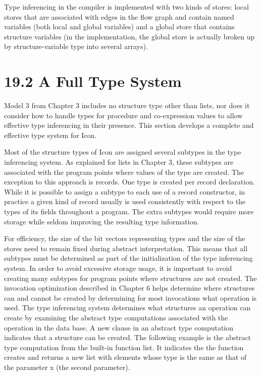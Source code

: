 Type inferencing in the compiler is implemented with two kinds of
stores: local stores that are associated with edges in the flow graph
and contain named variables (both local and global variables) and a
global store that contains structure variables (in the implementation,
the global store is actually broken up by structure-variable type into
several arrays).


\section[19.2 A Full Type System]{19.2 A Full Type System}

Model 3 from Chapter 3 includes no structure type other than lists,
nor does it consider how to handle types for procedure and
co-expression values to allow effective type inferencing in their
presence. This section develops a complete and effective type system
for Icon.

Most of the structure types of Icon are assigned several subtypes in
the type inferencing system. As explained for lists in Chapter 3,
these subtypes are associated with the program points where values of
the type are created. The exception to this approach is records. One
type is created per record declaration. While it is possible to assign
a subtype to each use of a record constructor, in practice a given
kind of record usually is used consistently with respect to the types
of its fields throughout a program. The extra subtypes would require
more storage while seldom improving the resulting type information.

For efficiency, the size of the bit vectors representing types and the
size of the stores need to remain fixed during abstract
interpretation. This means that all subtypes must be determined as
part of the initialization of the type inferencing system. In order to
avoid excessive storage usage, it is important to avoid creating many
subtypes for program points where structures are not created. The
invocation optimization described in Chapter 6 helps determine where
structures can and cannot be created by determining for most
invocations what operation is used. The type inferencing system
determines what structures an operation can create by examining the
abstract type computations associated with the operation in the data
base. A new clause in an abstract type computation indicates that a
structure can be created. The following example is the abstract type
computation from the built-in function list. It indicates the the
function creates and returns a new list with elements whose type is
the same as that of the parameter x (the second parameter).

